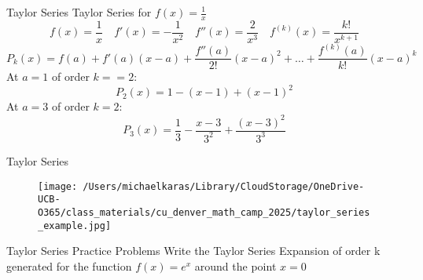 \documentclass[aspectratio=169]{beamer}
\begin{document}
\begin{frame}{Taylor Series}\label{main1}
Taylor Series for $f(x) = \frac{1}{x}$
\[
f(x) = \frac{1}{x} \quad f'(x) = -\frac{1}{x^2} \quad f''(x) = \frac{2}{x^3} \quad f^{(k)}(x) = \frac{k!}{x^{k+1}}
\]
\[
P_k(x) = f(a) + f'(a)(x - a) + \frac{f''(a)}{2!}(x - a)^2 + \ldots + \frac{f^{(k)}(a)}{k!}(x - a)^k
\]
At $a=1$ of order $k==2$:
\[
P_2(x) = 1 - (x - 1) + (x - 1)^2
\]
At $a=3$ of order $k=2$:
\[
P_3(x) = \frac{1}{3} - \frac{x - 3}{3^2} + \frac{(x - 3)^2}{3^3}
\]

\end{frame}

\begin{frame}{Taylor Series}\label{main1}
    \begin{figure}
        \centering
        \texttt{[image: /Users/michaelkaras/Library/CloudStorage/OneDrive-UCB-O365/class\_materials/cu\_denver\_math\_camp\_2025/taylor\_series\_example.jpg]}
    \end{figure}
\end{frame}

\begin{frame}{Taylor Series Practice Problems}\label{main1}
	\vspace{-4cm}
Write the Taylor Series Expansion of order k generated for the function \( f(x) = e^{x} \) around the point \( x = 0 \)
\end{frame}
\end{document}

